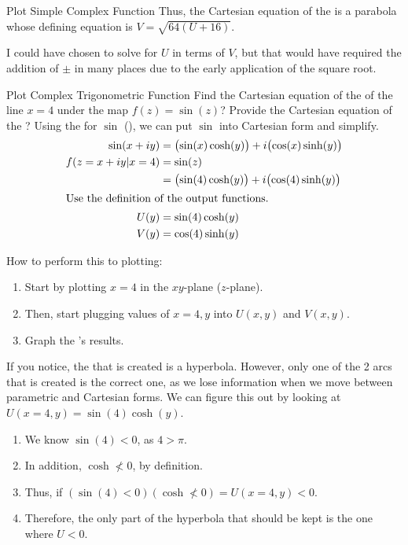 \begin{example}[Lecture 4]{Plot Simple Complex Function}
  Thus, the Cartesian equation of the  is a parabola whose defining equation is $V = \sqrt{64 (U+16)}$.

  \begin{remark*}
    I could have chosen to solve for $U$ in terms of $V$, but that would have required the addition of $\pm$ in many places due to the early application of the square root.
  \end{remark*}
\end{example}

\begin{example}[Lecture 4]{Plot Complex Trigonometric Function}
  Find the Cartesian equation of the  of the line $x=4$ under the map $f(z) = \sin(z)$?
  Provide the Cartesian equation of the ?
  \tcblower{}
  Using the  for $\sin$ (), we can put $\sin$ into Cartesian form and simplify.
  \begin{align*}
    \sin(x + iy) &= \bigl( \sin(x) \cosh(y) \bigr) + i \bigl( \cos(x) \sinh(y) \bigr) \\
    f(z = x + iy \vert x=4 ) &= \sin(z) \\
                 &= \bigl( \sin(4) \cosh(y) \bigr) + i \bigl( \cos(4) \sinh(y) \bigr) \\
    \shortintertext{Use the definition of the output functions.}
    U(y) &= \sin(4) \cosh(y) \\
    V(y) &= \cos(4) \sinh(y)
  \end{align*}

  How to perform this  to  plotting:
  \begin{enumerate}[noitemsep]
  \item Start by plotting $x=4$ in the $xy$-plane ($z$-plane).
  \item Then, start plugging values of $x=4, y$ into $U(x, y)$ and $V(x, y)$.
  \item Graph the 's results.
  \end{enumerate}

  If you notice, the  that is created is a hyperbola.
  However, only one of the 2 arcs that is created is the correct one, as we lose information when we move between parametric and Cartesian forms.
  We can figure this out by looking at $U(x=4, y) = \sin(4) \cosh(y)$.
  \begin{enumerate}[noitemsep]
  \item We know $\sin(4) < 0$, as $4 > \pi$.
  \item In addition, $\cosh \nless 0$, by definition.
  \item Thus, if $(\sin(4) < 0) (\cosh \nless 0) = U(x=4, y) < 0$.
  \item Therefore, the only part of the hyperbola that should be kept is the one where $U < 0$.
  \end{enumerate}


\end{example}
